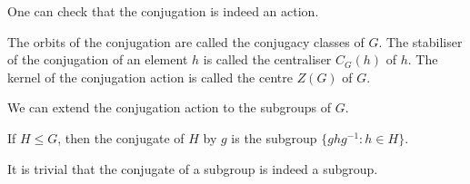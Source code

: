 One can check that the conjugation is indeed an action.
\begin{definition}
    The orbits of the conjugation are called the conjugacy classes of $G$.
    The stabiliser of the conjugation of an element $h$ is called the centraliser $C_G(h)$ of $h$.
    The kernel of the conjugation action is called the centre $Z(G)$ of $G$.
\end{definition}
We can extend the conjugation action to the subgroups of $G$.
\begin{definition}
    If $H\le G$, then the conjugate of $H$ by $g$ is the subgroup $\{ghg^{-1}:h\in H\}$.
\end{definition}
It is trivial that the conjugate of a subgroup is indeed a subgroup.
